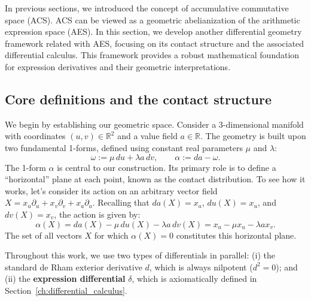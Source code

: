 In previous sections, we introduced the concept of accumulative commutative space (ACS).
ACS can be viewed as a geometric abelianization of the arithmetic expression space (AES).
In this section, we develop another differential geometry framework related with AES, focusing on its contact structure and the associated differential calculus.
This framework provides a robust mathematical foundation for expression derivatives and their geometric interpretations.

\subsection{Core definitions and the contact structure}\label{subsec:core_definitions}

We begin by establishing our geometric space. Consider a 3-dimensional manifold with coordinates $(u,v) \in \mathbb{R}^2$ and a value field $a \in \mathbb{R}$. The geometry is built upon two fundamental 1-forms, defined using constant real parameters $\mu$ and $\lambda$:
\begin{equation}\label{eq:contact_forms_def}
\omega := \mu\,du + \lambda a\,dv, \qquad \alpha := da - \omega.
\end{equation}
The 1-form $\alpha$ is central to our construction. Its primary role is to define a ``horizontal'' plane at each point, known as the contact distribution. To see how it works, let's consider its action on an arbitrary vector field $X = x_u \partial_u + x_v \partial_v + x_a \partial_a$. Recalling that $da(X) = x_a$, $du(X) = x_u$, and $dv(X) = x_v$, the action is given by:
\[
\alpha(X) = da(X) - \mu\,du(X) - \lambda a\,dv(X) = x_a - \mu x_u - \lambda a x_v.
\]
The set of all vectors $X$ for which $\alpha(X)=0$ constitutes this horizontal plane.

Throughout this work, we use two types of differentials in parallel: (i) the standard de Rham exterior derivative $d$, which is always nilpotent ($d^2=0$); and (ii) the \textbf{expression differential} $\delta$, which is axiomatically defined in Section~\ref{ch:differential_calculus}.

